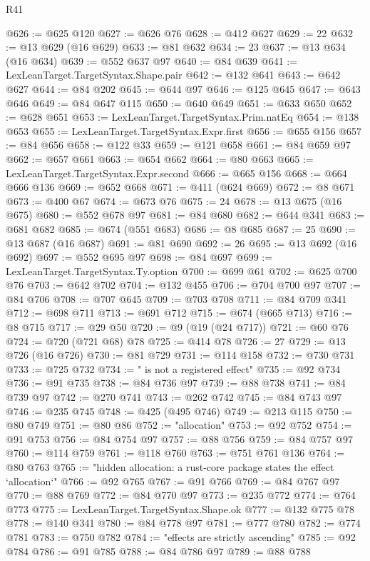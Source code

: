 \begin{lexlean}{R41}
\begin{coremodule}
{{{{{{{{{{{{{{{{{{{{{{{{{{{{{{{{{{{{{{{{{{{{{{{{{{{{{{{{{{{{{{{{{{{{{{{{{{{{{{{{{{{{{{{@626 := @625 @120
@627 := @626 @76
@628 := @412 @627
@629 := 22
@632 := @13 @629 (@16 @629)
@633 := @81 @632
@634 := 23
@637 := @13 @634 (@16 @634)
@639 := @552 @637 @97
@640 := @84 @639
@641 := LexLeanTarget.TargetSyntax.Shape.pair
@642 := @132 @641
@643 := @642 @627
@644 := @84 @202
@645 := @644 @97
@646 := @125 @645
@647 := @643 @646
@649 := @84 @647 @115
@650 := @640 @649
@651 := @633 @650
@652 := @628 @651
@653 := LexLeanTarget.TargetSyntax.Prim.natEq
@654 := @138 @653
@655 := LexLeanTarget.TargetSyntax.Expr.first
@656 := @655 @156
@657 := @84 @656
@658 := @122 @33
@659 := @121 @658
@661 := @84 @659 @97
@662 := @657 @661
@663 := @654 @662
@664 := @80 @663
@665 := LexLeanTarget.TargetSyntax.Expr.second
@666 := @665 @156
@668 := @664 @666 @136
@669 := @652 @668
@671 := @411 (@624 @669)
@672 := @8 @671
@673 := @400 @67
@674 := @673 @76
@675 := 24
@678 := @13 @675 (@16 @675)
@680 := @552 @678 @97
@681 := @84 @680
@682 := @644 @341
@683 := @681 @682
@685 := @674 (@551 @683)
@686 := @8 @685
@687 := 25
@690 := @13 @687 (@16 @687)
@691 := @81 @690
@692 := 26
@695 := @13 @692 (@16 @692)
@697 := @552 @695 @97
@698 := @84 @697
@699 := LexLeanTarget.TargetSyntax.Ty.option
@700 := @699 @61
@702 := @625 @700 @76
@703 := @642 @702
@704 := @132 @455
@706 := @704 @700 @97
@707 := @84 @706
@708 := @707 @645
@709 := @703 @708
@711 := @84 @709 @341
@712 := @698 @711
@713 := @691 @712
@715 := @674 (@665 @713)
@716 := @8 @715
@717 := @29 @50
@720 := @9 (@19 (@24 @717))
@721 := @60 @76
@724 := @720 (@721 @68) @78
@725 := @414 @78
@726 := 27
@729 := @13 @726 (@16 @726)
@730 := @81 @729
@731 := @114 @158
@732 := @730 @731
@733 := @725 @732
@734 := " is not a registered effect"
@735 := @92 @734
@736 := @91 @735
@738 := @84 @736 @97
@739 := @88 @738
@741 := @84 @739 @97
@742 := @270 @741
@743 := @262 @742
@745 := @84 @743 @97
@746 := @235 @745
@748 := @425 (@495 @746)
@749 := @213 @115
@750 := @80 @749
@751 := @80 @86
@752 := "allocation"
@753 := @92 @752
@754 := @91 @753
@756 := @84 @754 @97
@757 := @88 @756
@759 := @84 @757 @97
@760 := @114 @759
@761 := @118 @760
@763 := @751 @761 @136
@764 := @80 @763
@765 := "hidden allocation: a rust-core package states the effect `allocation`"
@766 := @92 @765
@767 := @91 @766
@769 := @84 @767 @97
@770 := @88 @769
@772 := @84 @770 @97
@773 := @235 @772
@774 := @764 @773
@775 := LexLeanTarget.TargetSyntax.Shape.ok
@777 := @132 @775 @78
@778 := @140 @341
@780 := @84 @778 @97
@781 := @777 @780
@782 := @774 @781
@783 := @750 @782
@784 := "effects are strictly ascending"
@785 := @92 @784
@786 := @91 @785
@788 := @84 @786 @97
@789 := @88 @788
}}}}}}}}}}}}}}}}}}}}}}}}}}}}}}}}}}}}}}}}}}}}}}}}}}}}}}}}}}}}}}}}}}}}}}}}}}}}}}}}}}}}}}}
\end{coremodule}
\end{lexlean}
